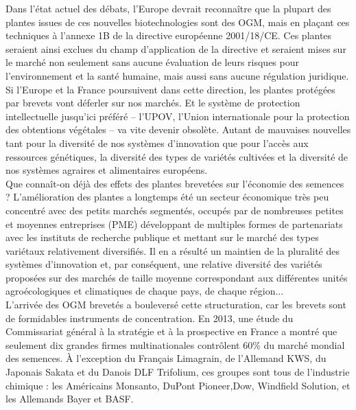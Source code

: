 \documentclass[8pt]{article}
\begin{document}
Dans l'état actuel des débats, l'Europe devrait reconnaître que la plupart des plantes issues de ces nouvelles biotechnologies sont des OGM, mais en plaçant ces techniques à l'annexe 1B de la directive européenne 2001/18/CE. Ces plantes seraient ainsi exclues du champ d'application de la directive et seraient mises sur le marché non seulement sans aucune évaluation de leurs risques pour l'environnement et la santé humaine, mais aussi sans aucune régulation juridique. Si l'Europe et la France poursuivent dans cette direction, les plantes protégées par brevets vont déferler sur nos marchés. Et le système de protection intellectuelle jusqu'ici préféré – l'UPOV, l'Union internationale pour la protection des obtentions végétales – va vite devenir obsolète. Autant de mauvaises nouvelles tant pour la diversité de nos systèmes d'innovation que pour l'accès aux ressources génétiques, la diversité des types de variétés cultivées et la diversité de nos systèmes agraires et alimentaires européens.\\

Que connaît-on déjà des effets des plantes brevetées sur l'économie des semences ? L'amélioration des plantes a longtemps été un secteur économique très peu concentré avec des petits marchés segmentés, occupés par de nombreuses petites et moyennes entreprises (PME) développant de multiples formes de partenariats avec les instituts de recherche publique et mettant sur le marché des types variétaux relativement diversifiés. Il en a résulté un maintien de la pluralité des systèmes d'innovation et, par conséquent, une relative diversité des variétés proposées sur des marchés de taille moyenne correspondant aux différentes unités agroécologiques et climatiques de chaque pays, de chaque région...\\

L’arrivée des OGM brevetés a bouleversé cette structuration, car les brevets sont de formidables instruments de concentration. 
En 2013, une étude du Commissariat général à la stratégie et à la prospective en France a montré que seulement dix grandes firmes multinationales contrôlent 60\% du marché mondial des semences. 
À l’exception du Français Limagrain, de l’Allemand KWS, du Japonais Sakata et du Danois DLF Trifolium, ces groupes sont tous de l’industrie chimique : les Américains Monsanto, DuPont Pioneer,Dow, Windfield Solution, et les Allemands Bayer et BASF.\\
\end{document}
